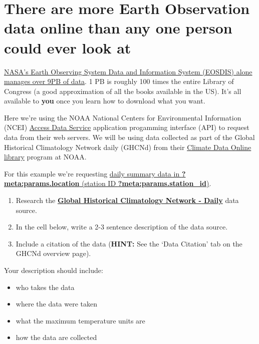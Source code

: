 \documentclass[
  letterpaper,
  DIV=11,
  numbers=noendperiod,
  oneside]{scrreprt}
\providecommand{\tightlist}{%
  \setlength{\itemsep}{0pt}\setlength{\parskip}{0pt}}
\begin{document}
\section{There are more Earth Observation data online than any one
person could ever look
at}\label{there-are-more-earth-observation-data-online-than-any-one-person-could-ever-look-at-1}

\href{https://www.earthdata.nasa.gov/learn/articles/getting-petabytes-people-how-eosdis-facilitates-earth-observing-data-discovery-and-use}{NASA's
Earth Observing System Data and Information System (EOSDIS) alone
manages over 9PB of data}. 1 PB is roughly 100 times the entire Library
of Congress (a good approximation of all the books available in the US).
It's all available to \textbf{you} once you learn how to download what
you want.

Here we're using the NOAA National Centers for Environmental Information
(NCEI)
\href{https://www.ncei.noaa.gov/support/access-data-service-api-user-documentation}{Access
Data Service} application progamming interface (API) to request data
from their web servers. We will be using data collected as part of the
Global Historical Climatology Network daily (GHCNd) from their
\href{https://www.ncdc.noaa.gov/cdo-web/datasets}{Climate Data Online
library} program at NOAA.

For this example we're requesting
\href{https://www.ncdc.noaa.gov/cdo-web/datasets/GHCND/stations/GHCND:?meta:params.station_id/detail}{daily
summary data in \textbf{?meta:params.location} (station ID
\textbf{?meta:params.station\_id})}.

\begin{enumerate}
\def\labelenumi{\arabic{enumi}.}
\tightlist
\item
  Research the
  \href{https://www.ncei.noaa.gov/metadata/geoportal/rest/metadata/item/gov.noaa.ncdc:C00861/html}{\textbf{Global
  Historical Climatology Network - Daily}} data source.
\item
  In the cell below, write a 2-3 sentence description of the data
  source.
\item
  Include a citation of the data (\textbf{HINT:} See the `Data Citation'
  tab on the GHCNd overview page).
\end{enumerate}

Your description should include:

\begin{itemize}
\tightlist
\item
  who takes the data
\item
  where the data were taken
\item
  what the maximum temperature units are
\item
  how the data are collected
\end{itemize}
\end{document}
